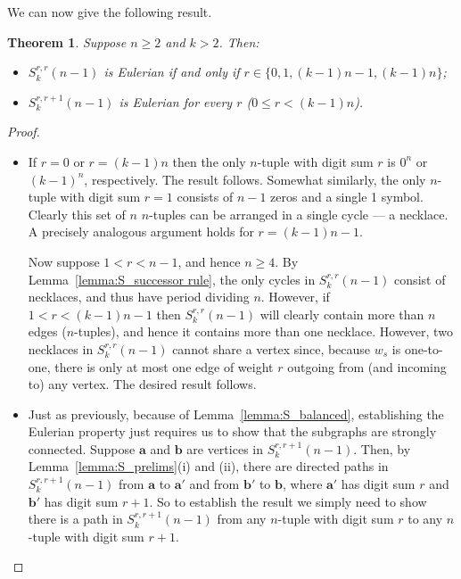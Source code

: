 \documentclass[a4paper,11pt]{article}
\theoremstyle{plain}
\newtheorem{theorem}[lemma]{Theorem}
\theoremstyle{definition}
\theoremstyle{remark}
\begin{document}
We can now give the following result.

\begin{theorem}  \label{theorem:S_characteristic}
Suppose $n\geq2$ and $k>2$. Then:
\begin{itemize}
\item[(i)] $S_k^{r,r}(n-1)$ is Eulerian if and only if $r\in\{0,1,(k-1)n-1,(k-1)n\}$;
\item[(ii)] $S_k^{r,r+1}(n-1)$ is Eulerian for every $r$ ($0\leq r<(k-1)n$).
\end{itemize}
\end{theorem}

\begin{proof}
\begin{itemize}
\item[(i)] If $r=0$ or $r=(k-1)n$ then the only $n$-tuple with digit sum $r$ is $0^n$ or
    $(k-1)^n$, respectively.  The result follows.  Somewhat similarly, the only $n$-tuple with
    digit sum $r=1$ consists of $n-1$ zeros and a single 1 symbol.  Clearly this set of $n$
    $n$-tuples can be arranged in a single cycle --- a necklace.  A precisely analogous
    argument holds for $r=(k-1)n-1$.

    Now suppose $1<r<n-1$, and hence $n\geq4$.  By Lemma~\ref{lemma:S_successor rule}, the only
cycles in $S_k^{r,r}(n-1)$ consist of necklaces, and thus have period dividing $n$.  However,
if $1<r<(k-1)n-1$ then $S_k^{r,r}(n-1)$ will clearly contain more than $n$ edges ($n$-tuples),
and hence it contains more than one necklace.  However, two necklaces in $S_k^{r,r}(n-1)$
cannot share a vertex since, because $w_s$ is one-to-one, there is only at most one edge of
weight $r$ outgoing from (and incoming to) any vertex. The desired result follows.
\item[(ii)] Just as previously, because of Lemma~\ref{lemma:S_balanced}, establishing the
    Eulerian property just requires us to show that the subgraphs are strongly connected.
    Suppose $\mathbf{a}$ and $\mathbf{b}$ are vertices in $S_k^{r,r+1}(n-1)$.  Then, by
    Lemma~\ref{lemma:S_prelims}(i) and (ii), there are directed paths in $S_k^{r,r+1}(n-1)$
    from $\mathbf{a}$ to $\mathbf{a}'$ and from $\mathbf{b}'$ to $\mathbf{b}$, where
    $\mathbf{a}'$ has digit sum $r$ and $\mathbf{b}'$ has digit sum $r+1$.  So to establish the
    result we simply need to show there is a path in $S_k^{r,r+1}(n-1)$ from any $n$-tuple with
    digit sum $r$ to any $n$-tuple with digit sum $r+1$.


\end{itemize}
\end{proof}
\end{document}
